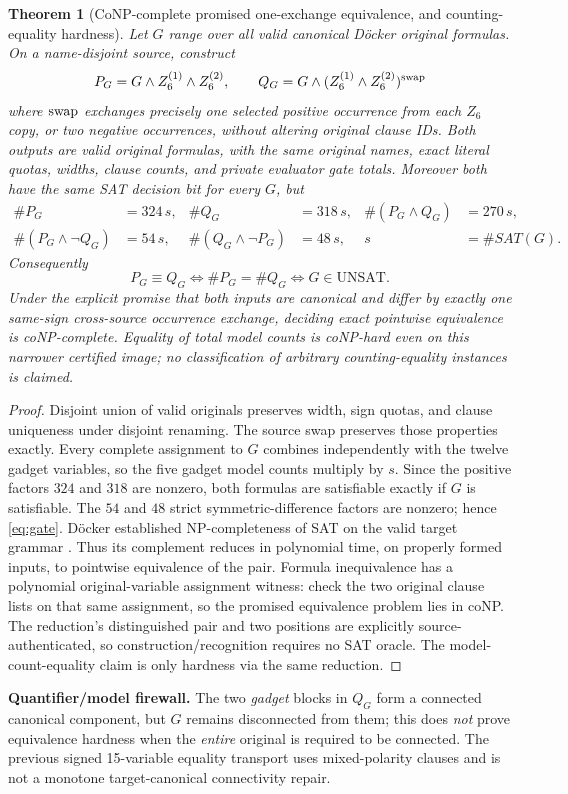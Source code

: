 \documentclass[11pt]{article}
\newtheorem{theorem}{Theorem}
\begin{document}
\begin{theorem}[CoNP-complete promised one-exchange equivalence, and counting-equality hardness]\label{thm:promise}
Let $G$ range over \emph{all valid} canonical D\"ocker original formulas. On a name-disjoint source, construct
\[
 P_G=G\land Z_6^{(1)}\land Z_6^{(2)},\qquad
 Q_G=G\land (Z_6^{(1)}\land Z_6^{(2)})^{\rm swap}
\]
where \(\rm swap\) exchanges precisely one selected positive occurrence from each $Z_6$ copy, or two negative occurrences, without altering original clause IDs. Both outputs are valid original formulas, with the same original names, exact literal quotas, widths, clause counts, and private evaluator gate totals. Moreover both have the \emph{same SAT decision bit} for every $G$, but
\[
\begin{aligned}
 \#P_G&=324\,s,& \#Q_G&=318\,s,& \#(P_G\land Q_G)&=270\,s,\\
 \#(P_G\land\neg Q_G)&=54\,s,&
 \#(Q_G\land\neg P_G)&=48\,s,&s&=\#SAT(G).
\end{aligned}
\]
Consequently
\begin{equation}\label{eq:gate}
 \boxed{P_G\equiv Q_G\iff \#P_G=\#Q_G\iff G\in\mathrm{UNSAT}.}
\end{equation}
Under the explicit promise that both inputs are canonical and differ by exactly one same-sign cross-source occurrence exchange, deciding exact \emph{pointwise} equivalence is coNP-complete. Equality of total model counts is coNP-hard even on this narrower certified image; no classification of arbitrary counting-equality instances is claimed.
\end{theorem}
\begin{proof}
Disjoint union of valid originals preserves width, sign quotas, and clause uniqueness under disjoint renaming. The source swap preserves those properties exactly. Every complete assignment to $G$ combines independently with the twelve gadget variables, so the five gadget model counts multiply by $s$. Since the positive factors $324$ and $318$ are nonzero, both formulas are satisfiable exactly if $G$ is satisfiable. The $54$ and $48$ strict symmetric-difference factors are nonzero; hence \eqref{eq:gate}. D\"ocker established NP-completeness of SAT on the valid target grammar \cite{docker2019}. Thus its complement reduces in polynomial time, on properly formed inputs, to pointwise equivalence of the pair. Formula inequivalence has a polynomial original-variable assignment witness: check the two original clause lists on that same assignment, so the promised equivalence problem lies in coNP. The reduction's distinguished pair and two positions are explicitly source-authenticated, so construction/recognition requires no SAT oracle. The model-count-equality claim is only hardness via the same reduction.
\end{proof}
\noindent\textbf{Quantifier/model firewall.} The two \emph{gadget} blocks in $Q_G$ form a connected canonical component, but $G$ remains disconnected from them; this does \emph{not} prove equivalence hardness when the \emph{entire} original is required to be connected. The previous signed 15-variable equality transport uses mixed-polarity clauses and is not a monotone target-canonical connectivity repair.
\end{document}
